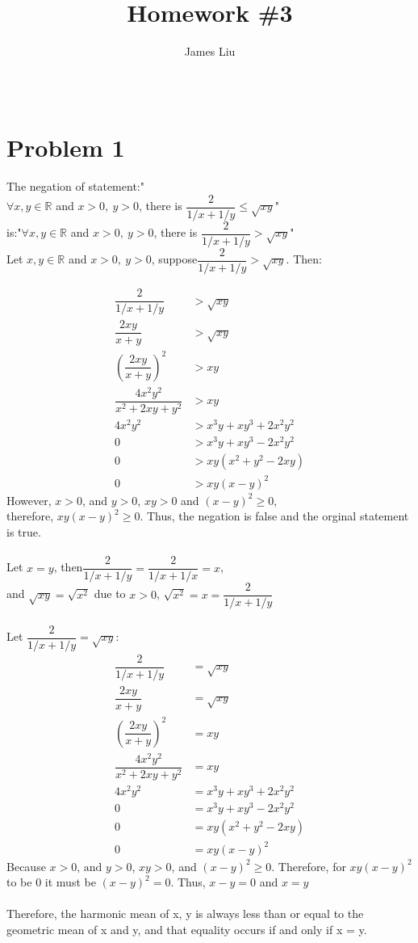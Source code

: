 \documentclass{article}
\title{\textbf{Homework \#3 }}
\author{James Liu}
\date{\ }
\begin{document}
\maketitle

\section*{Problem 1}
    The negation of statement:"\\
    \(\forall x,y\in \mathbb{R}\) and \(x>0,\ y>0\), there is \(\dfrac{2}{1/x+1/y} \leqslant \sqrt{xy}\)"\\
    is:"\(\forall x,y\in \mathbb{R}\) and \(x>0,\ y>0\), there is \(\dfrac{2}{1/x+1/y} >\sqrt{xy}\)"
    \\
    Let \(x,y\in \mathbb{R}\) and \(x>0,\ y>0\), suppose\(\dfrac {2}{1/x+1/y}> \sqrt{xy}\). Then:

    \begin{align*}
        \dfrac {2}{1/x+1/y}&> \sqrt{xy}\\
        \dfrac{2xy}{x+y}&>\sqrt{xy}\\
        \left( \dfrac{2xy}{x+y}\right)^2 &>xy\\
        \dfrac{4x^2y^2}{x^2+2xy+y^2}&>xy\\
        4x^2y^2&>x^3y+xy^3+2x^2y^2\\
        0&>x^3y+xy^3-2x^2y^2\\
        0&>xy(x^2+y^2-2xy)\\
        0&>xy(x-y)^2
    \end{align*}
    However, \(x>0\), and \(y>0\), \(xy>0\) and \((x-y)^2\geqslant 0\),\\
    therefore, \(xy(x-y)^2\geqslant 0\). Thus, the negation is false and the orginal statement is true.
    \\
    \\
    Let \(x=y\), then\(\dfrac{2}{1/x+1/y} = \dfrac{2}{1/x+1/x}=x\),\\
    and \(\sqrt{xy}=\sqrt{x^2}\) due to \(x>0\), \(\sqrt{x^2}=x=\dfrac{2}{1/x+1/y}\)
    \\
    \\
    Let \(\dfrac{2}{1/x+1/y} = \sqrt{xy}\):
    \begin{align*}
        \dfrac {2}{1/x+1/y}&= \sqrt{xy}\\
        \dfrac{2xy}{x+y}&=\sqrt{xy}\\
        \left( \dfrac{2xy}{x+y}\right)^2 &=xy\\
        \dfrac{4x^2y^2}{x^2+2xy+y^2}&=xy\\
        4x^2y^2&=x^3y+xy^3+2x^2y^2\\
        0&=x^3y+xy^3-2x^2y^2\\
        0&=xy(x^2+y^2-2xy)\\
        0&=xy(x-y)^2
    \end{align*}
    Because \(x>0\text{, and }y>0\), \(xy>0\), and \((x-y)^2\geqslant 0\). Therefore, for \(xy(x-y)^2\) to be \(0\)
    it must be \((x-y)^2=0\). Thus, \(x-y=0\) and \(x=y\)\\
    \\
    Therefore, the harmonic mean of x, y is always less than or equal to the geometric
    mean of x and y, and that equality occurs if and only if x = y.
\newpage
\end{document}
